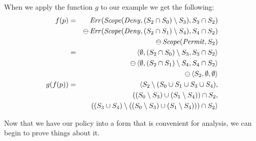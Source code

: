 When we apply the function $g$ to our example we get the following:
\begin{eqnarray*}
  f(p) & = & \text{\textit{Err}} (\text{\textit{Scope}} (\text{\textit{Deny}}, (S_2 \cap S_0) \setminus S_3), S_3 \cap S_2) \\
  & & \ominus \, \text{\textit{Err}} (\text{\textit{Scope}} (\text{\textit{Deny}}, (S_2 \cap S_1) \setminus S_4), S_4 \cap S_2) \\
  & & \ominus \, \text{\textit{Scope}} (\text{\textit{Permit}}, S_2)
  \\
  & = & \langle \emptyset, (S_2 \cap S_0) \setminus S_3, S_3 \cap S_2 \rangle \\
  & & \;\, \ominus \, \langle \emptyset, (S_2 \cap S_1) \setminus S_4, S_4 \cap S_2 \rangle \\
  & & \;\, \ominus \, \langle S_2, \emptyset, \emptyset \rangle
  \\
  g(f(p))  & = & \langle S_2 \setminus (S_0 \cup S_1 \cup S_3 \cup S_4), \\
  & & \;\, ((S_0 \setminus S_3) \cup (S_1 \setminus S_4)) \cap S_2, \\
  & & \;\, ((S_3 \cup S_4) \setminus ((S_0 \setminus S_3) \cup 
  (S_1 \setminus S_4))) \cap S_2 \rangle
\end{eqnarray*}

Now that we have our policy into a form that is convenient for
analysis, we can begin to prove things about it.



